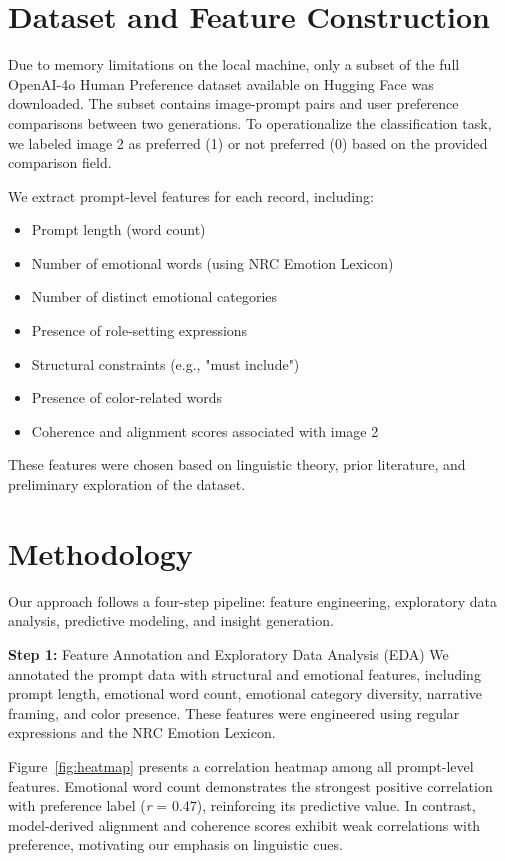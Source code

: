 \documentclass[conference]{IEEEtran}
\begin{document}
\section{Dataset and Feature Construction}
Due to memory limitations on the local machine, only a subset of the full OpenAI-4o Human Preference dataset available on Hugging Face was downloaded. The subset contains image-prompt pairs and user preference comparisons between two generations. To operationalize the classification task, we labeled image 2 as preferred (1) or not preferred (0) based on the provided comparison field.

We extract prompt-level features for each record, including:
\begin{itemize}
\item Prompt length (word count)
\item Number of emotional words (using NRC Emotion Lexicon)
\item Number of distinct emotional categories
\item Presence of role-setting expressions
\item Structural constraints (e.g., "must include")
\item Presence of color-related words
\item Coherence and alignment scores associated with image 2
\end{itemize}

These features were chosen based on linguistic theory, prior literature, and preliminary exploration of the dataset.

\section{Methodology}
Our approach follows a four-step pipeline: feature engineering, exploratory data analysis, predictive modeling, and insight generation.

\textbf{Step 1:} Feature Annotation and Exploratory Data Analysis (EDA)
We annotated the prompt data with structural and emotional features, including prompt length, emotional word count, emotional category diversity, narrative framing, and color presence. These features were engineered using regular expressions and the NRC Emotion Lexicon.

Figure~\ref{fig:heatmap} presents a correlation heatmap among all prompt-level features. Emotional word count demonstrates the strongest positive correlation with preference label (\textit{r} = 0.47), reinforcing its predictive value. In contrast, model-derived alignment and coherence scores exhibit weak correlations with preference, motivating our emphasis on linguistic cues.
\end{document}
